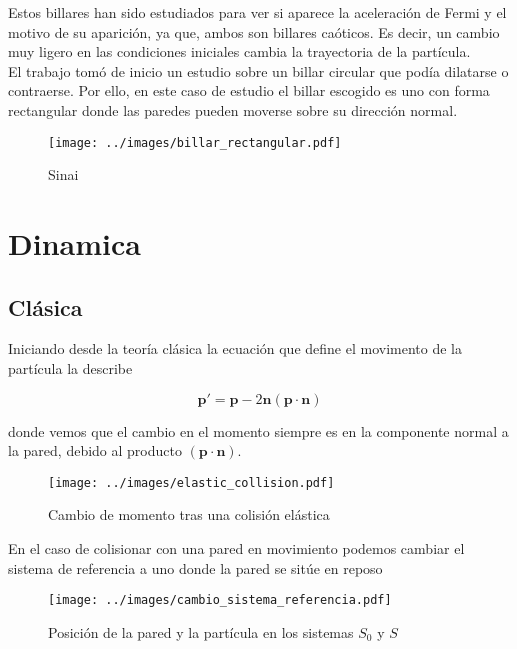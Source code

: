\documentclass[11pt, spanish]{article}
\begin{document}
Estos billares han sido estudiados para ver si aparece la aceleración de Fermi y el motivo de su aparición, ya que, ambos son billares caóticos. Es decir, un cambio muy ligero en las condiciones iniciales cambia la trayectoria de la partícula. \\

El trabajo tomó de inicio un estudio sobre un billar circular que podía dilatarse o contraerse. Por ello, en este caso de estudio el billar escogido es uno con forma rectangular donde las paredes pueden moverse sobre su dirección normal. \\

\begin{figure}[!h]
    \centering
    \texttt{[image: ../images/billar\_rectangular.pdf]}
    \caption{Sinai}
    \label{fig:Bunimovich}
\end{figure}

\section{Dinamica}

\subsection{Clásica}

Iniciando desde la teoría clásica la ecuación que define el movimento de la partícula la describe

\begin{equation}\label{eq:elastic_col}
    \mathbf{p}' = \mathbf{p} - 2\mathbf{n}(\mathbf{p} \cdot \mathbf{n})
\end{equation}

donde vemos que el cambio en el momento siempre es en la componente normal a la pared, debido al producto \( (\mathbf{p} \cdot \mathbf{n}) \). \\

\begin{figure}[H]
    \centering
    \texttt{[image: ../images/elastic\_collision.pdf]}
    \caption{Cambio de momento tras una colisión elástica}
    \label{fig:elastic_col}
\end{figure}

En el caso de colisionar con una pared en movimiento podemos cambiar el sistema de referencia a uno donde la pared se sitúe en reposo

\begin{figure}[H]
    \centering
    \texttt{[image: ../images/cambio\_sistema\_referencia.pdf]}
    \caption{Posición de la pared y la partícula en los sistemas $S_0$ y $S$}
    \label{fig:cambio_referencia}
\end{figure}
\end{document}
